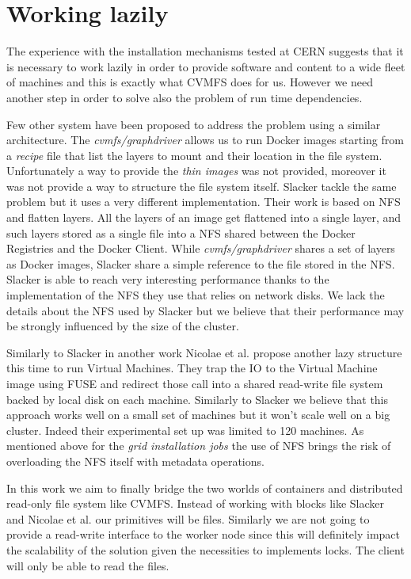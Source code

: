 \section{Working lazily} \label{sec:soalazy}

The experience with the installation mechanisms tested at CERN suggests that it
is necessary to work lazily in order to provide software and content to a wide
fleet of machines and this is exactly what CVMFS does for us. However we need
another step in order to solve also the problem of run time dependencies.

Few other system have been proposed to address the problem using a similar
architecture. The \textit{cvmfs/graphdriver} \cite{graphdriver-plugin} allows
us to run Docker images starting from a \textit{recipe} file that  list the
layers to mount and their location in the file system. Unfortunately a way to
provide the \textit{thin images} was not provided, moreover it was not provide
a way to structure the file system itself. Slacker \cite{slacker} tackle the
same problem but it uses a very different implementation. Their work is based
on NFS and flatten layers. All the layers of an image get flattened into a
single layer, and such layers stored as a single file into a NFS shared between
the Docker Registries and the Docker Client. While \textit{cvmfs/graphdriver}
shares a set of layers as Docker images, Slacker share a simple reference to
the file stored in the NFS. Slacker is able to reach very interesting
performance thanks to the implementation of the NFS they use that relies on
network disks. We lack the details about the NFS used by Slacker but we believe
that their performance may be strongly influenced by the size of the cluster.

Similarly to Slacker in another work Nicolae et al. \cite{back-forth} propose
another lazy structure this time to run Virtual Machines. They trap the IO to
the Virtual Machine image using FUSE and redirect those call into a shared
read-write file system backed by local disk on each machine.  Similarly to
Slacker we believe that this approach works well on a small set of machines but
it won't scale well on a big cluster. Indeed their experimental set up was
limited to 120 machines. As mentioned above for the \textit{grid installation
jobs} the use of NFS brings the risk of overloading the NFS itself with
metadata operations.

In this work we aim to finally bridge the two worlds of containers and
distributed read-only file system like CVMFS. Instead of working with blocks
like Slacker and Nicolae et al. our primitives will be files. Similarly we are
not going to provide a read-write interface to the worker node since this
will definitely impact the scalability of the solution given the necessities to
implements locks. The client will only be able to read the files.

